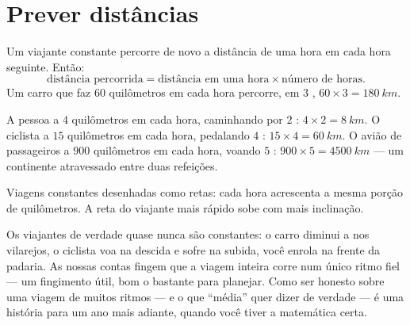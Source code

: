 \section{Prever distâncias}

\begin{proposition}\label{prop:g5:speed-distance-time:distance}
Um viajante constante percorre de novo a distância de uma hora em
cada hora seguinte. Então:
\[
\text{distância percorrida} = \text{distância em uma hora} \times
\text{número de horas}.
\]
Um carro que faz $60$ quilômetros em cada hora percorre, em $3$
, $60 \times 3 = \qty{180}{km}$.
\end{proposition}

\begin{example}\label{ex:g5:speed-distance-time:journeys}
A pessoa a $4$ quilômetros em cada hora, caminhando por $2$ :
$4 \times 2 = \qty{8}{km}$. O ciclista a $15$ quilômetros em cada
hora, pedalando $4$ : $15 \times 4 = \qty{60}{km}$. O avião de
passageiros a $900$ quilômetros em cada hora, voando $5$ :
$900 \times 5 = \qty{4500}{km}$ --- um continente atravessado entre
duas refeições.
\end{example}

\begin{omfigure}

{\small Viagens constantes desenhadas como retas: cada hora
acrescenta a mesma porção de quilômetros. A reta do viajante mais
rápido sobe com mais inclinação.}
\end{omfigure}

\begin{remark}\label{rem:g5:speed-distance-time:steady}
Os viajantes de verdade quase nunca são constantes: o carro diminui a
 nos vilarejos, o ciclista voa na descida e sofre na
subida, você enrola na frente da padaria. As nossas contas fingem que
a viagem inteira corre num único ritmo fiel --- um fingimento útil,
bom o bastante para planejar. Como ser honesto sobre uma viagem de
muitos ritmos --- e o que ``média'' quer dizer de verdade --- é uma
história para um ano mais adiante, quando você tiver a matemática
certa.
\end{remark}

